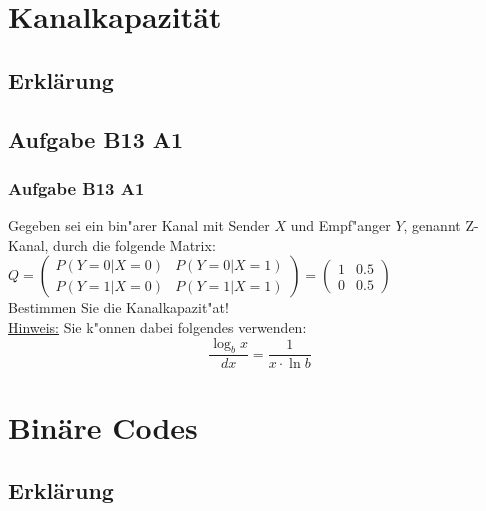 




\section{Kanalkapazität}
\subsection{Erklärung}
\subsection{Aufgabe B13 A1}
\begin{frame}
\frametitle{Aufgabe B13 A1}
Gegeben sei ein bin"arer Kanal mit Sender $X$ und Empf"anger $Y$, genannt Z-Kanal,
durch die folgende Matrix:\\[4pt]
$Q = \left( \begin{array}{cc}
P(Y=0|X=0) & P(Y=0|X=1) \\ P(Y=1|X=0) & P(Y=1|X=1)
\end{array} \right) = \left( \begin{array}{cc}
1 & 0.5 \\ 0 & 0.5
\end{array} \right)$\\[4pt]
Bestimmen Sie die Kanalkapazit"at!\\[4pt]
\underline{Hinweis:} Sie k"onnen dabei folgendes verwenden:
\[ \frac{\log_b{x}}{dx} = \frac{1}{x \cdot \ln{b}} \]
\end{frame}


\section{Binäre Codes}
\subsection{Erklärung}
